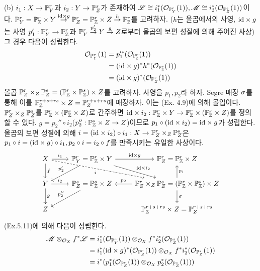 \begin{enumerate}[label=\tb{5.\arabic*.},itemindent=0mm,itemsep=4mm]
	(b) $i_1:X\rightarrow\mathbb{P}_Y^r$과 $i_2:Y\rightarrow\mathbb{P}_Z^s$가 존재하여
	$\mathscr{L}\cong i_1^*(\mathcal{O}_{\mathbb{P}_Y^r}(1)),\mathscr{M}\cong i_2^*(\mathcal{O}_{\mathbb{P}_Z^s}(1))$이다.
	$\mathbb{P}_Y^r=\mathbb{P}_\mathbb Z^r\times Y\stackrel{\mathrm{id}\times g}{\rightarrow}\mathbb{P}_Z^r=\mathbb{P}_\mathbb Z^r\times Z\stackrel{h}{\rightarrow}\mathbb{P}_\mathbb Z^r$를 고려하자.
	($h$는 올곱에서의 사영, $\mathrm{id}\times g$는 사영 $p_1':\mathbb{P}_Y^r\rightarrow\mathbb{P}_\mathbb Z^r$과 $\mathbb{P}_Y^r\stackrel{p_2'}{\rightarrow} Y\stackrel{g}{\rightarrow} Z$로부터
	올곱의 보편 성질에 의해 주어진 사상) 그 경우 다음이 성립한다.
	\begin{align*}
	\mathcal{O}_{\mathbb{P}_Y^r}(1)&=p_1'^*(\mathcal{O}_{\mathbb{P}_\mathbb Z^r}(1))\\
	&=(\mathrm{id}\times g)^*h^*(\mathcal{O}_{\mathbb{P}_\mathbb Z^r}(1))\\
	&=(\mathrm{id}\times g)^*(\mathcal{O}_{\mathbb{P}_Z^r}(1))
	\end{align*}
	올곱 $\mathbb{P}_Z^r\times_Z\mathbb{P}_Z^s=(\mathbb{P}_\mathbb Z^r\times\mathbb{P}_\mathbb Z^s)\times Z$를 고려하자. 사영을 $p_1,p_2$라 하자.
	Segre 매장 $\sigma$를 통해 이를 $\mathbb{P}_\mathbb Z^{r+s+rs}\times Z=\mathbb{P}_Z^{r+s+rs}$에 매장하자.
	이는 (Ex. 4.9)에 의해 몰입이다.
	$\mathbb{P}_Z^r\times_Z\mathbb{P}^s_Z$를 $\mathbb{P}^r_\mathbb Z\times(\mathbb{P}_\mathbb Z^s\times Z)$로 간주하면
	$\mathrm{id}\times i_2:\mathbb{P}^r_\mathbb Z\times Y\rightarrow\mathbb{P}^r_\mathbb Z\times(\mathbb{P}_\mathbb Z^s\times Z)$를 정의할 수 있다.
	$g=p_2''\circ i_2$($p_2'':\mathbb{P}^s_\mathbb Z\times Z\rightarrow Z$)이므로 $p_1\circ(\mathrm{id}\times i_2)=\mathrm{id}\times g$가 성립한다.
	올곱의 보편 성질에 의해 $i=(\mathrm{id}\times i_2)\circ i_1:X\rightarrow\mathbb{P}_Z^r\times_Z\mathbb{P}_Z^s$은
	$p_1\circ i=(\mathrm{id}\times g)\circ i_1,p_2\circ i=i_2\circ f$를 만족시키는 유일한 사상이다.
	$$\begin{tikzcd}X\arrow[d,"f"]\arrow[r,"i_1"]\arrow[drr,dashed,swap,"i"]
	&\mb P_Y^r=\mb P_\Z^r\times Y\arrow[r,"\mrm{id}\times g"]\arrow[dl,swap,"p_2'"]\arrow[dr,"\mrm{id}\times i_2"]
	&\mb P_Z^r=\mb P_\Z^r\times Z\\
	Y\arrow[d,"g"]\arrow[r,"i_2"]&\mb P_Z^s=\mb P_\Z^s\times Z\arrow[dl,swap,"p_2''"]&\mb P_Z^r\times_Z\mb P_Z^s
	=(\mb P_\Z^r\times\mb P_\Z^s)\times Z\arrow[u,swap,"p_1"]\arrow[l,swap,"p_2"]\arrow[d,"\si"]\\
	Z&&\mb P_\Z^{r+s+rs}\times Z=\mb P_Z^{r+s+rs}\end{tikzcd}$$
	(Ex.5.11)에 의해 다음이 성립한다.
	\begin{align*}
	\ms M\otimes_{\mc O_X}f^*\ms L&=
	i_1^*(\mc O_{\mb P_Y^r}(1))\otimes_{\mc O_X}f^*i_2^*(\mc O_{\mb P_Z^s}(1))\\
	&=i_1^*(\mrm{id}\times g)^*(\mc O_{\mb P_Z^r}(1))\otimes_{\mc O_X}f^*i_2^*(\mc O_{\mb P_Z^s}(1))\\
	&=i^*(p_1^*(\mc O_{\mb P_Z^r}(1))\otimes_{\mc O_X}p_2^*(\mc O_{\mb P_Z^s}(1)))\\

\end{align*}
\end{enumerate}
